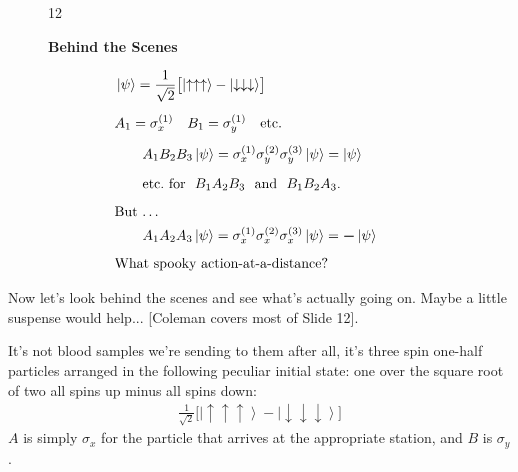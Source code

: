 \documentclass[twocolumn,prb]{revtex4}
\newcommand{\bs}[1]{\boldsymbol{#1}}
\newcommand{\ket}[1]{\left|#1\right\rangle}
\newcommand{\up}{\uparrow}
\newcommand{\dw}{\downarrow}
\begin{document}
\begin{figure}[htb] 
\begin{mdframed}
  \vspace{5pt}\hfill 12\\[-18pt]
  \begin{center}
    \textbf{Behind the Scenes}
  \end{center}
  \vspace{-5pt}
  \begin{align}\nonumber
    &\hspace{-20pt}
    \ket{\psi}=\frac{1}{\sqrt{2}}
    \bigl[\ket{\up\up\up} - \ket{\dw\dw\dw}\bigr]\\[5pt]\nonumber
    &\hspace{-20pt}
    A_1=\sigma_x^{(1)}\quad B_1=\sigma_y^{(1)} \quad\text{etc.}\\[5pt]\nonumber 
    &%
    A_1B_2B_3\ket{\psi}
    =\sigma_x^{(1)}\sigma_y^{(2)}\sigma_y^{(3)}\ket{\psi}
    =\ket{\psi}\\[5pt]\nonumber 
    &%
    \text{etc.\ for\ \ $B_1A_2B_3$\ \ and\ \ $B_1B_2A_3$.}\\[5pt]\nonumber 
    &\hspace{-20pt}\text{But \ldots}\\[0pt]\nonumber
    &%
    A_1A_2A_3\ket{\psi}
    =\sigma_x^{(1)}\sigma_x^{(2)}\sigma_x^{(3)}\ket{\psi}
    =\bs{-}\ket{\psi}\\[5pt]\nonumber
    &\hspace{-20pt}\text{What spooky action-at-a-distance?}
  \end{align}
\vspace{-.5\baselineskip}
\end{mdframed}
\end{figure}
Now let's look behind the scenes and see what's actually going on.
Maybe a little suspense would help... [Coleman covers most of Slide 12].

It's not blood samples we're sending to them after all, it's three spin one-half particles arranged in the following peculiar initial state: one over the square root of two all spins up minus all spins down:
\begin{align}
  \frac{1}{\sqrt{2}}\bigl[\ket{\up\up\up} - \ket{\dw\dw\dw}\bigr]
\end{align}
$A$ is simply $\sigma_x$ for the particle that arrives at the appropriate station, and $B$ is $\sigma_y$.
\end{document}
